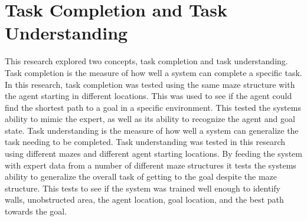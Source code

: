 \documentclass[12pt,american]{report}
\begin{document}
\section{Task Completion and Task Understanding}
This research explored two concepts, task completion and task understanding. Task completion is the measure of how well a system can complete a specific task.  In this research, task completion was tested using the same maze structure with the agent starting in different locations.  This was used to see if the agent could find the shortest path to a goal in a specific environment.  This tested the systems ability to mimic the expert, as well as its ability to recognize the agent and goal state.  
Task understanding is the measure of how well a system can generalize the task needing to be completed. Task understanding was tested in this research using different mazes and different agent starting locations.  By feeding the system with expert data from a number of different maze structures it tests the systems ability to generalize the overall task of getting to the goal despite the maze structure.  This tests to see if the system was trained well enough to identify walls, unobstructed area, the agent location, goal location, and the best path towards the goal.
\end{document}
